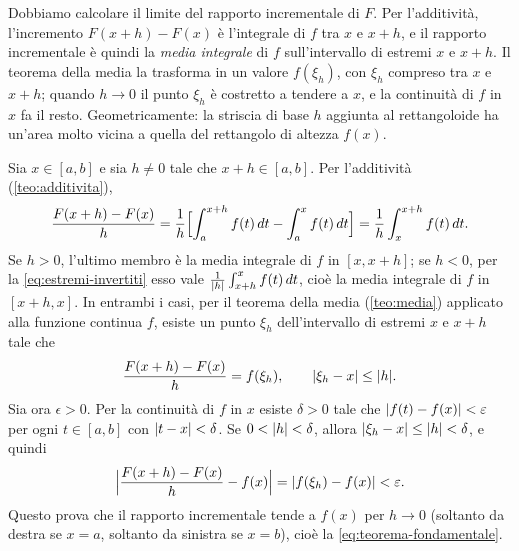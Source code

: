 \begin{schema}
\end{schema}

\begin{strategia}
Dobbiamo calcolare il limite del rapporto incrementale di $F$. Per l'additività,
l'incremento $F(x+h)-F(x)$ è l'integrale di $f$ tra $x$ e $x+h$, e il rapporto
incrementale è quindi la \emph{media integrale} di $f$ sull'intervallo di estremi $x$ e
$x+h$. Il teorema della media la trasforma in un valore $f(\xi_{h})$, con $\xi_{h}$ compreso
tra $x$ e $x+h$; quando $h\to0$ il punto $\xi_{h}$ è costretto a tendere a $x$, e la
continuità di $f$ in $x$ fa il resto. Geometricamente: la striscia di base $h$ aggiunta
al rettangoloide ha un'area molto vicina a quella del rettangolo di altezza $f(x)$.
\end{strategia}

\begin{dimostrazione}
Sia $x\in[a,b]$ e sia $h\neq0$ tale che $x+h\in[a,b]$. Per l'additività
(\cref{teo:additivita}),
\begin{equation}\label{eq:rapporto-funzione-integrale}
  \frac{F(x+h)-F(x)}h=\frac1h\Bigl[\int_{a}^{x+h}f(t)\,dt-\int_{a}^{x}f(t)\,dt\Bigr]
  =\frac1h\int_{x}^{x+h}f(t)\,dt .
\end{equation}
Se $h>0$, l'ultimo membro è la media integrale di $f$ in $[x,x+h]$; se $h<0$, per la
\eqref{eq:estremi-invertiti} esso vale $\frac1{\lvert h\rvert}\int_{x+h}^{x}f(t)\,dt$, cioè la media
integrale di $f$ in $[x+h,x]$. In entrambi i casi, per il teorema della media
(\cref{teo:media}) applicato alla funzione continua $f$, esiste un punto $\xi_{h}$
dell'intervallo di estremi $x$ e $x+h$ tale che
\begin{equation}\label{eq:rapporto-media}
  \frac{F(x+h)-F(x)}h=f(\xi_{h}), \qquad \lvert \xi_{h}-x\rvert\le\lvert h\rvert .
\end{equation}
Sia ora $\epsilon>0$. Per la continuità di $f$ in $x$ esiste $\delta>0$ tale che
$\lvert f(t)-f(x)\rvert<\varepsilon$ per ogni $t\in[a,b]$ con $\lvert t-x\rvert<\delta$. Se $0<\lvert h\rvert<\delta$,
allora $\lvert \xi_{h}-x\rvert\le\lvert h\rvert<\delta$, e quindi
\[
  \Bigl|\frac{F(x+h)-F(x)}h-f(x)\Bigr|=\lvert f(\xi_{h})-f(x)\rvert<\varepsilon .
\]
Questo prova che il rapporto incrementale tende a $f(x)$ per $h\to0$ (soltanto da destra
se $x=a$, soltanto da sinistra se $x=b$), cioè la \eqref{eq:teorema-fondamentale}.
\end{dimostrazione}

